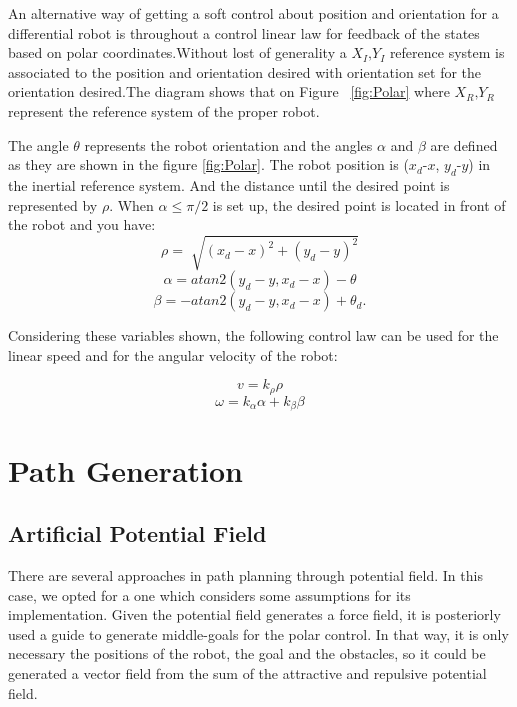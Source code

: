 \documentclass[conference]{IEEEtran}
\begin{document}
An alternative way of getting a soft control about position and orientation for a differential robot is throughout a control linear law for feedback  of the states based on polar coordinates.Without lost of generality a $\textbf{$X_{I}$,$Y_{I}$}$ reference system is associated to the position and orientation desired with orientation  set for the orientation desired.The diagram shows that on Figure ~\ref{fig:Polar} where $\textbf{$X_{R}$,$Y_{R}$}$ represent the reference system of the proper robot.

The angle $\theta$ represents the robot orientation and the angles $\alpha$ and $\beta$ are defined as they are shown in the figure \ref{fig:Polar}. The robot position is ($x_{d}$-$x$, $y_{d}$-$y$) in the inertial reference system. And the distance until the desired point is represented by $\rho$. When $\alpha \leq \pi/2 $ is set up, the desired point is located in front of the robot and you have:
\begin{equation}
	\rho = \sqrt[]{(x_{d} - x)^2 + (y_{d} - y)^2} 
\end{equation}
\begin{equation}
	\alpha = atan2(y_{d} - y, x_{d} - x) - \theta 
\end{equation}
\begin{equation}
	\beta = -atan2(y_{d} - y, x_{d} - x) + \theta_{d}.
\end{equation}

Considering these variables shown, the following control law can be used for the linear speed and for the angular velocity of the robot:

\begin{equation}
	v = k_{\rho}\rho
\end{equation}
\begin{equation}
	\omega = k_{\alpha}\alpha + k_{\beta}\beta
\end{equation}


\section{Path Generation}
\label{sec:APF}
\subsection{Artificial Potential Field}
There are several approaches in path planning through potential field. In this case, we opted for a one which considers some assumptions for its implementation. Given the potential field generates a force field, it is posteriorly used a guide to generate middle-goals for the polar control. In that way, it is only necessary the positions of the robot, the goal and the obstacles, so it could be generated a vector field from the sum of the attractive  and repulsive potential field.\\
\end{document}

